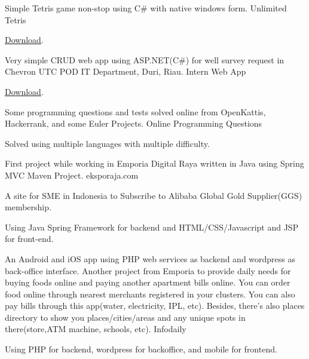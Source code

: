 \begin{cventries}
\cventry
    {Simple Tetris game non-stop using C\# with native windows form.}
    {Unlimited Tetris}
    {\href{https://github.com/mfathirirhas/Game-Tetris}{\faGithubSquare\acvHeaderIconSep\@Source}}
    {}
    {
        \begin{cvitems}
            \item {\href{https://github.com/mfathirirhas/Game-Tetris/raw/master/DAA/bin/Release/DAA.exe}{Download}.}
        \end{cvitems}
    }


\cventry
    {Very simple CRUD web app using ASP.NET(C\#) for well survey request in Chevron UTC POD IT Department, Duri, Riau.}
    {Intern Web App}
    {\href{https://github.com/mfathirirhas/KPChevron2015}{\faGithubSquare\acvHeaderIconSep\@Source}}
    {}
    {
        \begin{cvitems}
            \item {\href{https://github.com/mfathirirhas/Game-Tetris/raw/master/DAA/bin/Release/DAA.exe}{Download}.}
        \end{cvitems}
    }


\cventry
    {Some programming questions and tests solved online from OpenKattis, Hackerrank, and some Euler Projects.}
    {Online Programming Questions}
    {\href{https://github.com/mfathirirhas/ProgrammingChallenges}{\faGithubSquare\acvHeaderIconSep\@Source}}
    {}
    {
        \begin{cvitems}
            \item {Solved using multiple languages with multiple difficulty.}
        \end{cvitems}
    }


\cventry
    {First project while working in Emporia Digital Raya written in Java using Spring MVC Maven Project.}
    {eksporaja.com}
    {}
    {}
    {
        \begin{cvitems}
            \item {A site for SME in Indonesia to Subscribe to Alibaba Global Gold Supplier(GGS) membership.}
            \item {Using Java Spring Framework for backend and HTML/CSS/Javascript and JSP for front-end.}
        \end{cvitems}
    }


\cventry
    {An Android and iOS app using PHP web services as backend and wordpress as back-office interface. Another project from Emporia to provide daily needs for buying foods online and paying another apartment bills online. You can order food online through nearest merchants registered in your clusters. You can also pay bills through this app(water, electricity, IPL, etc). Besides, there's also places directory to show you places/cities/areas and any unique spots in there(store,ATM machine, schools, etc).}
    {Infodaily}
    {}
    {}
    {
        \begin{cvitems}
            \item {Using PHP for backend, wordpress for backoffice, and mobile for frontend.}
        \end{cvitems}
    }
\end{cventries}
